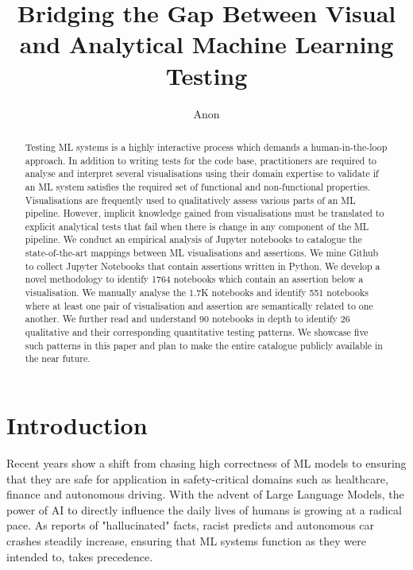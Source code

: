 \documentclass[acmsmall,screen,review,anonymous]{acmart}
\begin{document}
\title{Bridging the Gap Between Visual and Analytical Machine Learning Testing}

\author{Anon}

\begin{abstract}
Testing ML systems is a highly interactive process which demands
  a human-in-the-loop approach. In addition to writing tests for the
  code base, practitioners are required to analyse and interpret
  several visualisations using their domain expertise to validate if
  an ML system satisfies the required set of functional and
  non-functional properties. Visualisations are frequently used to
  qualitatively assess various parts of an ML pipeline. However,
  implicit knowledge gained from visualisations must be translated to
  explicit analytical tests that fail when there is change in any
  component of the ML pipeline. We conduct an empirical analysis of
  Jupyter notebooks to catalogue the state-of-the-art mappings between
  ML visualisations and assertions. We mine Github to collect Jupyter Notebooks that contain assertions written in Python. We develop a novel methodology to identify 1764 notebooks which contain an assertion below a visualisation. We manually analyse the 1.7K notebooks and identify 551 notebooks where at least one pair of visualisation and assertion are semantically related to one another. We further read and understand 90 notebooks in depth to identify 26 qualitative and their corresponding quantitative testing patterns. We showcase five such patterns in this paper and plan to make the entire catalogue publicly available in the near future.

\end{abstract}

\maketitle

\section{Introduction}\label{sec:intro}

Recent years show a shift from chasing high correctness of ML models to ensuring that they are safe for application in safety-critical domains such as healthcare, finance and autonomous driving. With the advent of Large Language Models, the power of AI to directly influence the daily lives of humans is growing at a radical pace. As reports of "hallucinated" facts, racist predicts and autonomous car crashes steadily increase, ensuring that ML systems function as they were intended to, takes precedence.
\end{document}
